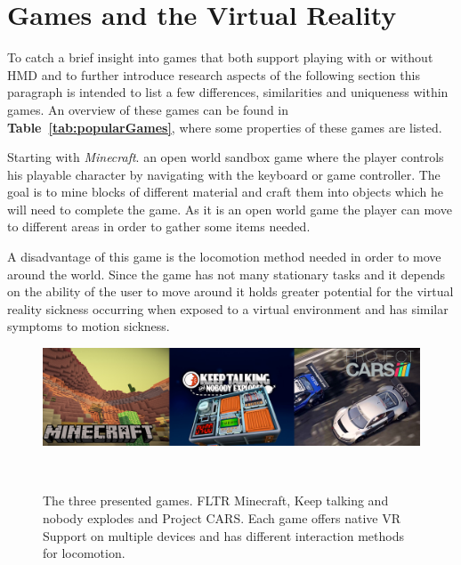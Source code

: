
\section{Games and the Virtual Reality}
\label{sec:gamesNvr}

To catch a brief insight into games that both support playing with or without HMD and to further introduce research aspects of the following section this paragraph is intended to list a few differences, similarities and uniqueness within games. An overview of these games can be found in \textbf{Table~\ref{tab:popularGames}}, where some properties of these games are listed. 

Starting with \textit{Minecraft}. an open world sandbox game where the player controls his playable character by navigating with the keyboard or game controller. The goal is to mine blocks of different material and craft them into objects which he will need to complete the game. As it is an open world game the player can move to different areas in order to gather some items needed. 

A disadvantage of this game is the locomotion method needed in order to move around the world. Since the game has not many stationary tasks and it depends on the ability of the user to move around it holds greater potential for the virtual reality sickness occurring when exposed to a virtual environment and has similar symptoms to motion sickness.

\begin{figure}
	\centering
	\includegraphics[width=0.99\columnwidth]{./figures/banner}
	\caption[banner]{The three presented games. FLTR Minecraft, Keep talking and nobody explodes and Project CARS. Each game offers native VR Support on multiple devices and has different interaction methods for locomotion.\footnotemark}~\label{fig:banner}
\end{figure}

